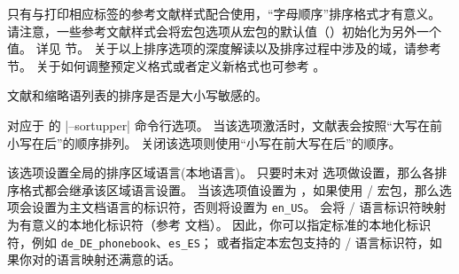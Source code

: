 \begin{optionlist}

只有与打印相应标签的参考文献样式配合使用，“字母顺序”排序格式才有意义。
请注意，一些参考文献样式会将宏包选项从宏包的默认值（）初始化为另外一个值。
详见  节。
关于以上排序选项的深度解读以及排序过程中涉及的域，请参考  节。
关于如何调整预定义格式或者定义新格式也可参考 。



文献和缩略语列表的排序是否是大小写敏感的。



对应于 \biber 的 |--sortupper| 命令行选项。
当该选项激活时，文献表会按照“大写在前小写在后”的顺序排列。
关闭该选项则使用“小写在前大写在后”的顺序。


该选项设置全局的排序区域语言(本地语言)。
只要时未对  选项做设置，那么各排序格式都会继承该区域语言设置。
当该选项值设置为 ，如果使用 / 宏包，那么选项会设置为主文档语言的标识符，否则将设置为 \texttt{en\_US}。
\biber 会将 / 语言标识符映射为有意义的本地化标识符（参考 \biber 文档）。
因此，你可以指定标准的本地化标识符，例如 \texttt{de\_DE\_phonebook}、\texttt{es\_ES}；
或者指定本宏包支持的 / 语言标识符，如果你对\biber 的语言映射还满意的话。




\end{optionlist}
